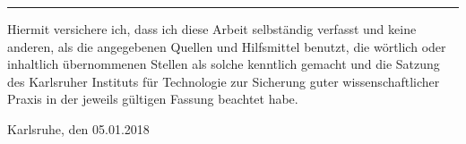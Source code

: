 \documentclass[12pt,a4paper,twoside, enabledeprecatedfontcommands]{scrartcl}
\numberwithin{equation}{section}
\begin{document}

\vspace*{0pt}\vfill

\hrule\medskip

Hiermit versichere ich, dass ich diese Arbeit selbständig verfasst und keine anderen, 
als die angegebenen Quellen und Hilfsmittel benutzt, die wörtlich oder inhaltlich 
übernommenen Stellen als solche kenntlich gemacht und die Satzung des Karlsruher 
Instituts für Technologie zur Sicherung guter wissenschaftlicher Praxis in der jeweils 
gültigen Fassung beachtet habe.

\vspace*{15mm}

\noindent
Karlsruhe, den 05.01.2018


\clearpage



\addto{}
\end{document}
